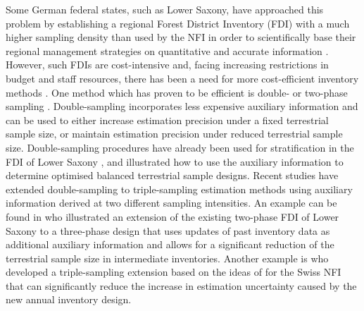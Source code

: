 \documentclass[remotesensing,article,submit,moreauthors,pdftex,10pt,a4paper]{mdpi}
\begin{document}
Some German federal states, such as Lower Saxony, have approached this problem by establishing a regional Forest District Inventory (FDI) with a much higher sampling density than used by the NFI in order to scientifically base their regional management strategies on quantitative and accurate information \citep{bockmann1998}. However, such FDIs are cost-intensive and, facing increasing restrictions in budget and staff resources, there has been a need for more cost-efficient inventory methods \citep{vonluepke2013}. One method which has proven to be efficient is double- or two-phase sampling \citep{sarndal2003, gregoire2007, kohl2006, mandallaz2008}. Double-sampling incorporates less expensive auxiliary information and can be used to either increase estimation precision under a fixed terrestrial sample size, or maintain estimation precision under reduced terrestrial sample size. Double-sampling procedures have already been used for stratification in the FDI of Lower Saxony \citep{saborowski2010}, and \citet{grafstrom2017a} illustrated how to use the auxiliary information to determine optimised balanced terrestrial sample designs. Recent studies have extended double-sampling to triple-sampling estimation methods using auxiliary information derived at two different sampling intensities. An example can be found in \citet{vonLuepke2012} who illustrated an extension of the existing two-phase FDI of Lower Saxony to a three-phase design that uses updates of past inventory data as additional auxiliary information and allows for a significant reduction of the terrestrial sample size in intermediate inventories. Another example is \citet{massey2014a} who developed a triple-sampling extension based on the ideas of \citet{mandallaz2013c} for the Swiss NFI that can significantly reduce the increase in estimation uncertainty caused by the new annual inventory design.\par
\end{document}

